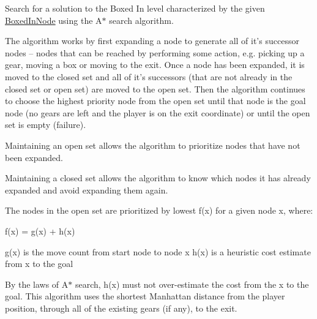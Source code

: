 Search for a solution to the Boxed In level characterized by the given \hyperlink{classboxedin_1_1BoxedInNode}{Boxed\+In\+Node} using the A$\ast$ search algorithm. 

The algorithm works by first expanding a node to generate all of it's successor nodes -- nodes that can be reached by performing some action, e.\+g. picking up a gear, moving a box or moving to the exit. Once a node has been expanded, it is moved to the closed set and all of it's successors (that are not already in the closed set or open set) are moved to the open set. Then the algorithm continues to choose the highest priority node from the open set until that node is the goal node (no gears are left and the player is on the exit coordinate) or until the open set is empty (failure).

Maintaining an open set allows the algorithm to prioritize nodes that have not been expanded.

Maintaining a closed set allows the algorithm to know which nodes it has already expanded and avoid expanding them again.

The nodes in the open set are prioritized by lowest f(x) for a given node x, where\+:

f(x) = g(x) + h(x)

g(x) is the move count from start node to node x h(x) is a heuristic cost estimate from x to the goal

By the laws of A$\ast$ search, h(x) must not over-\/estimate the cost from the x to the goal. This algorithm uses the shortest Manhattan distance from the player position, through all of the existing gears (if any), to the exit.

